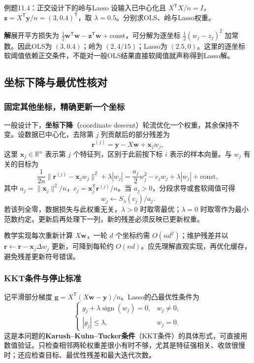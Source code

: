 \documentclass[UTF8,fontset=none,zihao=-4,a4paper]{ctexart}
\newcommand{\term}[1]{\textbf{#1}}
\newcommand{\sol}{\par\noindent\textbf{解}\quad}
\numberwithin{equation}{section}
\numberwithin{figure}{section}
\begin{document}
\begin{infobox}{例题11.4：正交设计下的岭与Lasso}
设输入已中心化且 $X^{\mathsf T}X/n=I$，$\symbf z=X^{\mathsf T}\symbf y/n=(3,0.4)^{\mathsf T}$，取 $\lambda=0.5$。分别求OLS、岭与Lasso权重。
\end{infobox}
\sol 展开平方损失为 $\tfrac12\symbf w^{\mathsf T}\symbf w-\symbf z^{\mathsf T}\symbf w+\mathrm{const}$，可分解为逐坐标 $\tfrac12(w_j-z_j)^2$ 加常数。因此OLS为 $(3,0.4)$；岭为 $(2,4/15)$；Lasso为 $(2.5,0)$。这里的逐坐标软阈值依赖正交条件，不能对一般OLS结果直接软阈值就声称得到Lasso解。

\subsection{坐标下降与最优性核对}
\subsubsection{固定其他坐标，精确更新一个坐标}
一般设计下，\term{坐标下降}（coordinate descent）轮流优化一个权重，其余保持不变。设数据已中心化，去除第 $j$ 列贡献后的部分残差为
\[
 \symbf r^{(j)}=\symbf y-X\symbf w+\symbf x_jw_j,
\]
这里 $\symbf x_j\in\mathbb R^n$ 表示第 $j$ 个特征列，区别于此前按下标 $i$ 表示的样本向量。与 $w_j$ 有关的目标为
\[
 \frac1{2n}\|\symbf r^{(j)}-\symbf x_jw_j\|^2+\lambda|w_j|
 =\frac{a_j}2w_j^2-c_jw_j+\lambda|w_j|+\mathrm{const},
\]
其中 $a_j=\|\symbf x_j\|^2/n$，$c_j=\symbf x_j^{\mathsf T}\symbf r^{(j)}/n$。当 $a_j>0$，分段求导或套软阈值可得
\begin{equation}
 w_j\leftarrow S_\lambda(c_j)/a_j.
\end{equation}
若该列全零，数据损失与此权重无关，$\lambda>0$ 时取零最优；$\lambda=0$ 时取零作为最小范数约定。更新后再处理下一列，新的残差必须反映已更新权重。

教学实现每次重新计算 $X\symbf w$，一轮 $d$ 个坐标约需 $O(nd^2)$；维护残差并以 $\symbf r\leftarrow\symbf r-\symbf x_j\Delta w_j$ 更新，可降到每轮约 $O(nd)$。应先理解直观实现，再优化缓存，避免残差更新符号错误。

\subsubsection{KKT条件与停止标准}
记平滑部分梯度 $\symbf g=X^{\mathsf T}(X\symbf w-\symbf y)/n$。Lasso的凸最优性条件为
\[
 \begin{cases}
 g_j+\lambda\operatorname{sign}(w_j)=0,&w_j\ne0,\\
 |g_j|\leq\lambda,&w_j=0.
 \end{cases}
\]
这是本问题的\term{Karush--Kuhn--Tucker条件}（KKT条件）的具体形式，可直接用数值验证。只检查相邻两轮权重差很小有时不够，尤其是特征强相关、收敛很慢时；还应检查目标、最优性残差和最大迭代次数。
\end{document}
